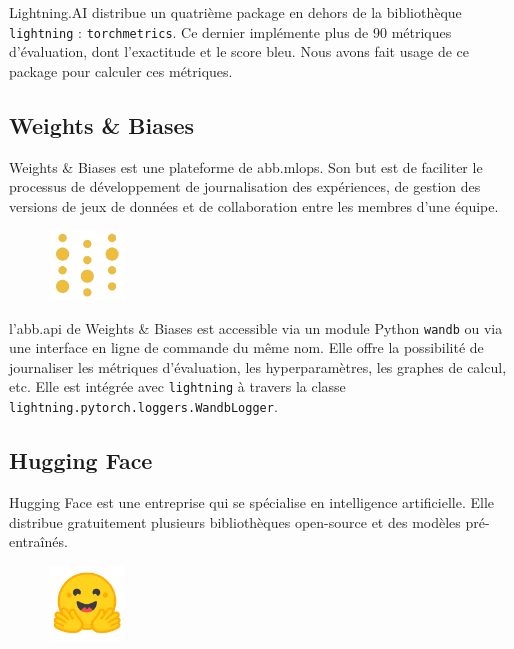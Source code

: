 \foreignlanguage{english}{Lightning.AI} distribue un quatrième package en dehors de la bibliothèque \verb|lightning| :
\verb|torchmetrics|.
Ce dernier implémente plus de 90 métriques d'évaluation, dont l'exactitude et le score \gls{bleu}.
Nous avons fait usage de ce package pour calculer ces métriques.

\subsection{\foreignlanguage{english}{Weights \& Biases}}
\label{subsec.wandb}

\foreignlanguage{english}{Weights \& Biases} est une plateforme de \gls{abb.mlops}.
Son but est de faciliter le processus de développement de journalisation des expériences,
de gestion des versions de jeux de données et de collaboration entre les membres d'une équipe.
\begin{figure}
    \begin{flushright}
        \includegraphics[width=2cm]{assets/images/wandb.png}
    \end{flushright}
\end{figure}

l'\gls{abb.api} de \foreignlanguage{english}{Weights \& Biases} est accessible via un module Python \verb|wandb|
ou via une interface en ligne de commande du même nom.
Elle offre la possibilité de journaliser les métriques d'évaluation, les hyperparamètres, les graphes de calcul, etc.
Elle est intégrée avec \verb|lightning| à travers la classe \verb|lightning.pytorch.loggers.WandbLogger|.

\subsection{\foreignlanguage{english}{Hugging Face}}
\label{subsec.huggingface}

\foreignlanguage{english}{Hugging Face} est une entreprise qui se spécialise en intelligence artificielle.
Elle distribue gratuitement plusieurs bibliothèques open-source et des modèles pré-entraînés.
\begin{figure}
    \vspace*{-\topsep}
    \begin{flushright}
        \includegraphics[width=2cm]{assets/images/huggingface.png}
    \end{flushright}
\end{figure}

